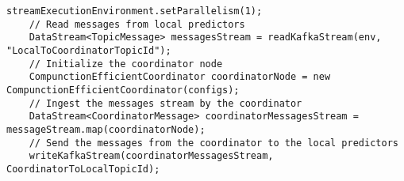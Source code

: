 \begin{lstlisting}[caption={The coordinator Flink program.},label={algonline:flink2},frame=single]	
    streamExecutionEnvironment.setParallelism(1);
	// Read messages from local predictors
	DataStream<TopicMessage> messagesStream = readKafkaStream(env, "LocalToCoordinatorTopicId");	
	// Initialize the coordinator node
	CompunctionEfficientCoordinator coordinatorNode = new CompunctionEfficientCoordinator(configs);
	// Ingest the messages stream by the coordinator	
	DataStream<CoordinatorMessage> coordinatorMessagesStream = messageStream.map(coordinatorNode);	
	// Send the messages from the coordinator to the local predictors
	writeKafkaStream(coordinatorMessagesStream, CoordinatorToLocalTopicId);
\end{lstlisting}

                 